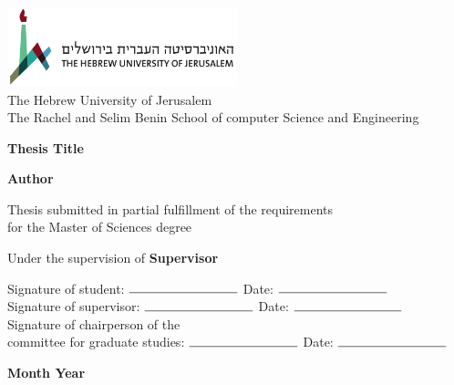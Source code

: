 \begin{titlepage}
    \begin{center}
        \vspace*{1cm}
        
        \includegraphics[width=0.5\textwidth]{images/huji_logo_hor.pdf}\\
        The Hebrew University of Jerusalem\\
        The Rachel and Selim Benin School of computer Science and Engineering
        
        \vspace{2cm}
        
        {\Large \textbf{Thesis Title}}
        
        \vspace{1.5cm}
        
        \textbf{Author}
        
        \vspace{1cm}
        
        Thesis submitted in partial fulfillment of the requirements\\for the Master of Sciences degree
        
        \vspace{1cm}
        
        Under the supervision of \textbf{Supervisor}
        
        \vspace{1cm}
        
        \begin{flushleft}
        Signature of student: \( \rule{3cm}{0.15mm} \) \hfill Date: \( \rule{3cm}{0.15mm} \)\\
        Signature of supervisor: \( \rule{3cm}{0.15mm} \) \hfill Date: \( \rule{3cm}{0.15mm} \)\\
        Signature of chairperson of the\\committee for graduate studies: \( \rule{3cm}{0.15mm} \) \hfill Date: \( \rule{3cm}{0.15mm} \)
        \end{flushleft}
        
        \vfill
        
        \textbf{Month Year}
    \end{center}
\end{titlepage}